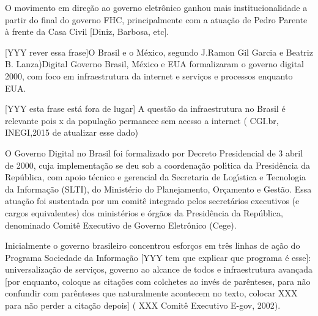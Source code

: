 \documentclass[
12pt,		%
openright,	%
twoside,  %
a4paper,			%
chapter=TITLE,		%
english,			%
french,				%
spanish,			%
brazil				%
]{USPSC-classe/USPSC}
\begin{document}
O movimento em dire\c{c}\~ao ao governo eletr\^onico ganhou mais institucionalidade a partir do final do governo FHC, principalmente com a atua\c{c}\~ao de Pedro Parente \`a frente da Casa Civil [Diniz, Barbosa, etc].














[YYY rever essa frase]O Brasil e o M\'exico, segundo J.Ramon Gil Garcia e Beatriz B. Lanza)Digital Governo Brasil, M\'exico e EUA formalizaram o governo digital 2000, com foco em infraestrutura da internet e servi\c{c}os e processos enquanto EUA.














[YYY esta frase est\'a fora de lugar] A quest\~ao da infraestrutura no Brasil \'e relevante pois x da popula\c{c}\~ao permanece sem acesso a internet ( CGI.br, INEGI,2015 de atualizar esse dado)














O Governo Digital no Brasil foi formalizado por Decreto Presidencial de 3 abril de 2000, cuja implementa\c{c}\~ao se deu sob a coordena\c{c}\~ao pol\'{\i}tica da Presid\^encia da Rep\'ublica, com apoio t\'ecnico e gerencial da Secretaria de Log\'{\i}stica e Tecnologia da Informa\c{c}\~ao (SLTI), do Minist\'erio do Planejamento, Or\c{c}amento e Gest\~ao. Essa atua\c{c}\~ao foi sustentada por um comit\^e integrado pelos secret\'arios executivos (e cargos equivalentes) dos minist\'erios e \'org\~aos da Presid\^encia da Rep\'ublica, denominado Comit\^e Executivo de Governo Eletr\^onico (Cege).














Inicialmente o governo brasileiro concentrou esfor\c{c}os em tr\^es linhas de a\c{c}\~ao do Programa Sociedade da Informa\c{c}\~ao [YYY tem que explicar que programa \'e esse]: universaliza\c{c}\~ao de servi\c{c}os, governo ao alcance de todos e infraestrutura avan\c{c}ada [por enquanto, coloque as cita\c{c}\~oes com colchetes ao inv\'es de par\^enteses, para n\~ao confundir com par\^enteses que naturalmente acontecem no texto, colocar XXX para n\~ao perder a cita\c{c}\~ao depois] ( XXX Comit\^e Executivo E-gov, 2002).
\end{document}
